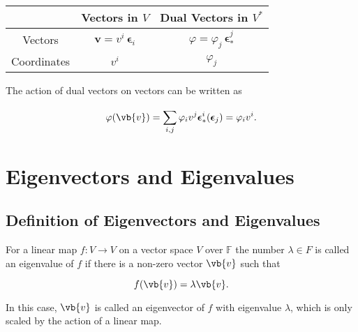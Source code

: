 \documentclass[a4paper,12pt]{report}
\begin{document}
\begin{table}[h] \label{dual} 
    \centering
    \begin{tabular}{|c|c|c|}
        \hline
        & \textbf{Vectors in \(V\)} & \textbf{Dual Vectors in \(V^*\)} \\
        \hline
        Vectors & \(\mathbf{v} = v^i \,\boldsymbol{\epsilon } _i\) &  \(\varphi = \varphi_j \,\boldsymbol{\epsilon } ^j_*\) \\
        \hline
        Coordinates & \(v^i\) &  \(\varphi_j\) \\
        \hline
    \end{tabular}
\end{table}

The action of dual vectors on vectors can be written as 

\begin{equation}
    \varphi (\vb{v} ) = \sum_{i,j}^{} \varphi _{i}v^{j}\boldsymbol{\epsilon }_{*}^{i} (\boldsymbol{\epsilon }_{j}  ) = \varphi _{i}v^{i}.        
\end{equation}








\chapter{Eigenvectors and Eigenvalues}

\section{Definition of Eigenvectors and Eigenvalues}



\begin{definition}
For a linear map \(f:V \rightarrow V\) on a vector space \(V\) over \(\mathbb{F}\) the number \(\lambda \in F\) is called an eigenvalue of \(f\) if there is a non-zero vector \(\vb{v} \) such that 

\begin{equation}
    f(\vb{v} ) = \lambda \vb{v} .
\end{equation}

In this case, \(\vb{v} \) is called an eigenvector of \(f\) with eigenvalue \(\lambda \), which is only scaled by the action of a linear map.

\end{definition}
\end{document}
